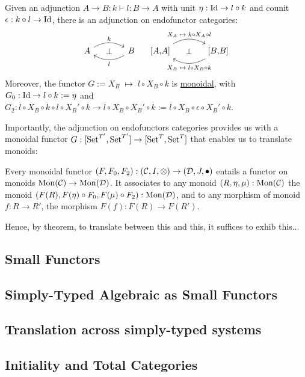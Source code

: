 \begin{proposition}
  Given an adjunction $A \to B : k \vdash l : B \to A$ with unit $\eta : \operatorname{Id}
  \to l \circ k$ and counit $\epsilon : k \circ l \to \operatorname{Id}$, there is an
  adjunction on endofunctor categories:
  \begin{align*}
    \begin{tikzcd}[ampersand replacement = \&, column sep=large]
      A \ar[r, bend left, "k"]
                \ar[r, phantom, "\perp"]
        \& B \ar[l, bend left, "l"]
    \end{tikzcd}
    &&
    \begin{tikzcd}[ampersand replacement = \&, column sep=large]
        {[}A{,}A{]} \ar[r, bend left, "X_A \;\mapsto\; k \circ X_A \circ l"]
                  \ar[r, phantom, "\perp"]
          \& {[}B{,}B{]} \ar[l, bend left, "X_B \;\mapsto\; l \circ X_B \circ k"]
    \end{tikzcd}
  \end{align*}
  Moreover, the functor $G := X_B \;\mapsto\; l \circ X_B \circ k$ is
  \hyperref[def:monoidal-functor]{monoidal}, with $G_0 : \operatorname{Id} \to l \circ k
  := \eta$ and $G_2 : l \circ X_B \circ k \circ l \circ X_B' \circ k \to l
  \circ X_B \circ X_B' \circ k := l \circ X_B \circ \epsilon \circ X_B'\circ
  k$.
\end{proposition}

\noindent Importantly, the adjunction on endofunctors categories provides
us with a monoidal functor $G : [\operatorname{Set}^{T'},\operatorname{Set}^{T'}] \to [\operatorname{Set}^T,\operatorname{Set}^T]$
that enables us to translate monoids:

\begin{proposition}
  \label{prop:functorial-monoids}
  Every monoidal functor $(F,F_0,F_2) : (\mathcal{C},I,\otimes) \to
  (\mathcal{D},J,\bullet)$ entails a functor on monoids $\operatorname{Mon}(\mathcal{C}) \to
  \operatorname{Mon}(\mathcal{D})$.
  It associates to any monoid $(R,\eta,\mu) : \operatorname{Mon}(\mathcal{C})$ the monoid
  $(F(R),F(\eta) \circ F_0,F(\mu) \circ F_2) : \operatorname{Mon}(\mathcal{D})$, and to any
  morphism of monoid $f : R \to R'$, the morphism $F(f) : F(R) \to F(R')$.
\end{proposition}

Hence, by theorem, to translate between this and this, it suffices to exhib this...



\subsection{Small Functors}

\subsection{Simply-Typed Algebraic as Small Functors}

\subsection{Translation across simply-typed systems}

\subsection{Initiality and Total Categories}
